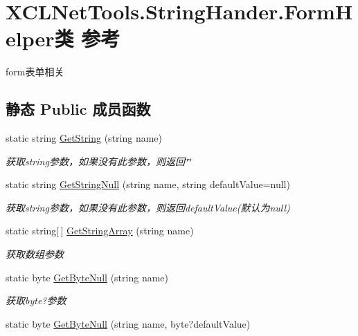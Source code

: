 \hypertarget{class_x_c_l_net_tools_1_1_string_hander_1_1_form_helper}{\section{X\-C\-L\-Net\-Tools.\-String\-Hander.\-Form\-Helper类 参考}
\label{class_x_c_l_net_tools_1_1_string_hander_1_1_form_helper}
}


form表单相关  


\subsection*{静态 Public 成员函数}
\begin{DoxyCompactItemize}
\item 
static string \hyperlink{class_x_c_l_net_tools_1_1_string_hander_1_1_form_helper_a8c34c5210ad29ea122ee8320b4f14f9f}{Get\-String} (string name)
\begin{DoxyCompactList}\small\item\em 获取string参数，如果没有此参数，则返回\char`\"{}\char`\"{} \end{DoxyCompactList}\item 
static string \hyperlink{class_x_c_l_net_tools_1_1_string_hander_1_1_form_helper_a953f8f717a6b0b26541f0a06c99fe19c}{Get\-String\-Null} (string name, string default\-Value=null)
\begin{DoxyCompactList}\small\item\em 获取string参数，如果没有此参数，则返回default\-Value(默认为null) \end{DoxyCompactList}\item 
static string\mbox{[}$\,$\mbox{]} \hyperlink{class_x_c_l_net_tools_1_1_string_hander_1_1_form_helper_a9b7680e6e7975889a62f273eaacdf37c}{Get\-String\-Array} (string name)
\begin{DoxyCompactList}\small\item\em 获取数组参数 \end{DoxyCompactList}\item 
static byte \hyperlink{class_x_c_l_net_tools_1_1_string_hander_1_1_form_helper_a9d43824d313342bfc66623f548ad6ad6}{Get\-Byte\-Null} (string name)
\begin{DoxyCompactList}\small\item\em 获取byte?参数 \end{DoxyCompactList}\item 
static byte \hyperlink{class_x_c_l_net_tools_1_1_string_hander_1_1_form_helper_a4b2dafb903bedae1af30683209520136}{Get\-Byte\-Null} (string name, byte?default\-Value)

\end{DoxyCompactItemize}
